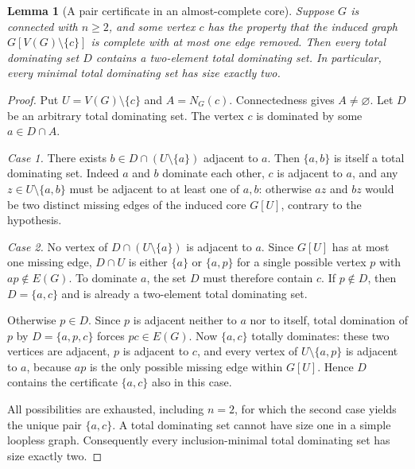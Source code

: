 \documentclass[11pt,a4paper]{article}
\newtheorem{lemma}[theorem]{Lemma}
\theoremstyle{definition}\newtheorem{definition}[theorem]{Definition}
\theoremstyle{remark}\newtheorem{remark}[theorem]{Remark}
\newcommand{\V}{V(G)}
\begin{document}
\begin{lemma}[A pair certificate in an almost-complete core]\label{lem:certificate}
Suppose $G$ is connected with $n\ge2$, and some vertex $c$ has the property that the induced graph $G[\V\setminus\{c\}]$ is complete with at most one edge removed. Then every total dominating set $D$ contains a two-element total dominating set. In particular, every minimal total dominating set has size exactly two.
\end{lemma}
\begin{proof}
Put $U=\V\setminus\{c\}$ and $A=N_G(c)$. Connectedness gives $A\ne\varnothing$. Let $D$ be an arbitrary total dominating set. The vertex $c$ is dominated by some $a\in D\cap A$.

\emph{Case 1.} There exists $b\in D\cap(U\setminus\{a\})$ adjacent to $a$. Then $\{a,b\}$ is itself a total dominating set. Indeed $a$ and $b$ dominate each other, $c$ is adjacent to $a$, and any $z\in U\setminus\{a,b\}$ must be adjacent to at least one of $a,b$: otherwise $az$ and $bz$ would be two distinct missing edges of the induced core $G[U]$, contrary to the hypothesis.

\emph{Case 2.} No vertex of $D\cap(U\setminus\{a\})$ is adjacent to $a$. Since $G[U]$ has at most one missing edge, $D\cap U$ is either $\{a\}$ or $\{a,p\}$ for a single possible vertex $p$ with $ap\notin E(G)$. To dominate $a$, the set $D$ must therefore contain $c$. If $p\notin D$, then $D=\{a,c\}$ and is already a two-element total dominating set.

Otherwise $p\in D$. Since $p$ is adjacent neither to $a$ nor to itself, total domination of $p$ by $D=\{a,p,c\}$ forces $pc\in E(G)$. Now $\{a,c\}$ totally dominates: these two vertices are adjacent, $p$ is adjacent to $c$, and every vertex of $U\setminus\{a,p\}$ is adjacent to $a$, because $ap$ is the only possible missing edge within $G[U]$. Hence $D$ contains the certificate $\{a,c\}$ also in this case.

All possibilities are exhausted, including $n=2$, for which the second case yields the unique pair $\{a,c\}$. A total dominating set cannot have size one in a simple loopless graph. Consequently every inclusion-minimal total dominating set has size exactly two.
\end{proof}
\end{document}
